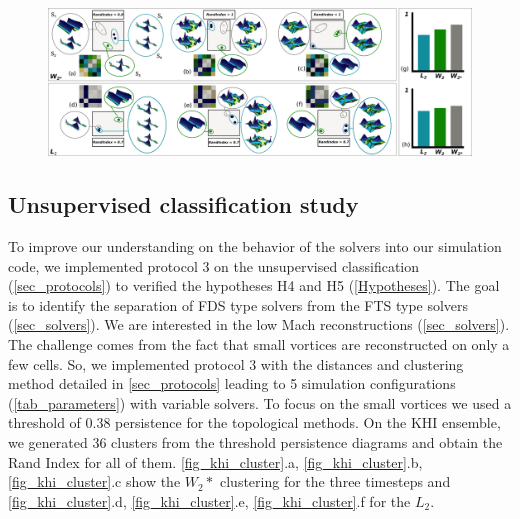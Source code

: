 \begin{figure}
 \centering %
 \vspace{-1ex}
 \includegraphics[width=\figureShrink\linewidth]{chapter4_topology_data_analysis/pictures/KHI_cluster.jpg}
\label{fig_khi_cluster}
\end{figure}


\subsection{Unsupervised classification study}
 \label{sec_khi_cluster}
To improve our understanding on the behavior of the solvers into our simulation code, we implemented protocol 3 on the unsupervised classification (\autoref{sec_protocols}) to verified the hypotheses H4 and H5 (\autoref{Hypotheses}). The goal is to identify the separation of FDS type solvers from the FTS type solvers (\autoref{sec_solvers}). We are interested in the low Mach reconstructions (\autoref{sec_solvers}). The challenge comes from the fact that small vortices are reconstructed on only a few cells. So, we implemented protocol 3 with the distances and clustering method detailed in \autoref{sec_protocols} leading to 5 simulation configurations (\autoref{tab_parameters}) with variable solvers. To focus on the small vortices we used a threshold of 0.38 persistence for the topological methods. On the KHI ensemble, we generated 36 clusters from the threshold persistence diagrams and obtain the Rand Index for all of them. \autoref{fig_khi_cluster}.a, \autoref{fig_khi_cluster}.b, \autoref{fig_khi_cluster}.c show the $W_2*$ clustering for the three timesteps and \autoref{fig_khi_cluster}.d, \autoref{fig_khi_cluster}.e, \autoref{fig_khi_cluster}.f for the $L_2$.

